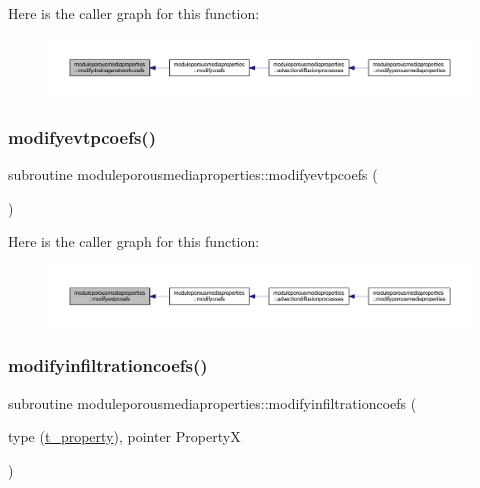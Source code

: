 Here is the caller graph for this function\+:\nopagebreak
\begin{figure}[H]
\begin{center}
\leavevmode
\includegraphics[width=350pt]{namespacemoduleporousmediaproperties_ab821bd146f4dac552711604b920efa4a_icgraph}
\end{center}
\end{figure}
\mbox{\label{namespacemoduleporousmediaproperties_acb53435edd626676edd69fc709aa276c}} 
\subsubsection{\texorpdfstring{modifyevtpcoefs()}{modifyevtpcoefs()}}
{\footnotesize\ttfamily subroutine moduleporousmediaproperties\+::modifyevtpcoefs (\begin{DoxyParamCaption}{ }\end{DoxyParamCaption})\hspace{0.3cm}{\ttfamily [private]}}

Here is the caller graph for this function\+:\nopagebreak
\begin{figure}[H]
\begin{center}
\leavevmode
\includegraphics[width=350pt]{namespacemoduleporousmediaproperties_acb53435edd626676edd69fc709aa276c_icgraph}
\end{center}
\end{figure}
\mbox{\label{namespacemoduleporousmediaproperties_a5e436455f541e5914817fe2e3c9aa3f1}} 
\subsubsection{\texorpdfstring{modifyinfiltrationcoefs()}{modifyinfiltrationcoefs()}}
{\footnotesize\ttfamily subroutine moduleporousmediaproperties\+::modifyinfiltrationcoefs (\begin{DoxyParamCaption}\item[{type (\mbox{\hyperlink{structmoduleporousmediaproperties_1_1t__property}{t\+\_\+property}}), pointer}]{PropertyX }\end{DoxyParamCaption})\hspace{0.3cm}{\ttfamily [private]}}

